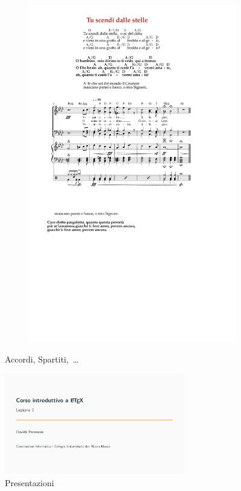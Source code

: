 \begin{figure}[!h]
\begin{subfigure}[b]{0.6\textwidth}
        \includegraphics[width=\textwidth]{img/spartiti}
    \end{subfigure}
  \caption{Accordi, Spartiti,~\dots}
\end{figure}\vspace{100px}\newpage
\begin{figure}[!h]\centering
  \includegraphics[width=0.7\textwidth,page=1]{img/presentazione}
  \caption{Presentazioni}
\end{figure}
